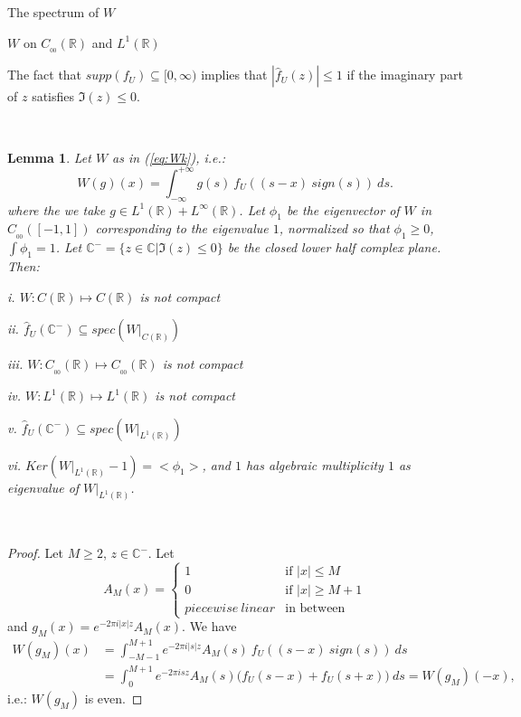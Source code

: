 \documentclass[12pt]{article}
\newtheorem*{lmm}{Lemma}
\begin{document}
\begin{section}{The spectrum of $W$ }
\begin{subsection}{$W$ on $C_{_{0\!0}}(\mathbb{R})$ and $L^1(\mathbb{R})$}
\  
\  

The fact that $supp(f_U) \subseteq [0,\infty)$ implies that $|\hat{f}_U(z)| \le 1$ if the imaginary part of $z$ satisfies $\Im(z) \le 0$.  

\  
\  

\begin{lmm}  Let $W$ as in (\ref{eq:Wk}), i.e.:
	\begin{equation*}
	W(g)(x) = \int_{-\infty}^{+\infty} g(s)\ f_U\!\left(  \left(s - x \right)\ sign(s) \right) \ ds.
	\end{equation*}
 where the we take $g \in  L^1(\mathbb{R}) + L^{\infty}(\mathbb{R})$. Let $\phi_1$ be the eigenvector of $W$ in $C_{_{0\!0}}([-1,1])$ corresponding to the eigenvalue $1$, normalized so that $\phi_1 \ge 0$, $\int \phi_1 = 1$. Let $\mathbb{C}^- = \{z \in \mathbb{C}| \Im(z) \le 0 \}$ be the closed lower half complex plane. Then:
	\item[i.]  $W: C(\mathbb{R}) \longmapsto C(\mathbb{R})$ is not compact
	
	\item[ii.] $\hat{f}_U(\mathbb{C}^-) \subseteq spec\left(W\Big|_{C(\mathbb{R})}  \right)$
	
	\item[iii.]  $W: C_{_{0\!0}}(\mathbb{R}) \longmapsto C_{_{0\!0}}(\mathbb{R}) $ is not compact
	
	\item[iv.]  $W: L^1(\mathbb{R}) \longmapsto L^1(\mathbb{R}) $ is not compact
	
	\item[v.] $\hat{f}_U(\mathbb{C}^-) \subseteq spec(W\Big|_{L^1(\mathbb{R})}) $

	\item[vi.] $ Ker\left( W\Big|_{L^1(\mathbb{R})} - 1 \right) = <\phi_1>$, and $1$ has algebraic multiplicity $1$ as eigenvalue of $W\Big|_{L^1(\mathbb{R})}$.
\end{lmm}
\  

\begin{proof} 
Let $M \ge 2$, $z \in \mathbb{C}^-$. Let 
$$
A_M(x)=
\begin{cases}
1  & \text{if } |x| \le M \\
0  & \text{if } |x| \ge M +1\\
piecewise \  linear & \text{in between}
\end{cases} 
$$ 
and $g_M(x) = e^{-2 \pi i |x| z} A_M(x)$. We have  
\begin{align*}
W(g_M)(x) &= \int_{-M-1}^{M+1} e^{-2 \pi i |s| z} A_M(s) \ f_U\!\left(  \left(s - x \right)\ sign(s) \right) \ ds \\
		&= \int_0^{M+1} e^{-2 \pi i s z} A_M(s) 
		\Big( f_U\!(  s - x ) + f_U\!(  s + x ) \Big) \ ds = W(g_M)(-x),
\end{align*} 
i.e.: $W(g_M)$ is even.  



\end{proof}
\end{subsection}
\end{section}
\end{document}
